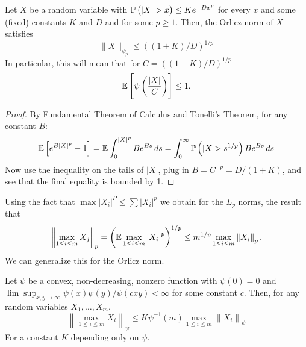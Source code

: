 \begin{lemma}
	\label{lemma:vdv2.2.1}
	Let \(X\) be a random variable  with  \(\P\left(|X|>x\right)\leq Ke^{-Dx^p}\) for every \(x\) and some (fixed) constants  \(K\) and  \(D\) and for some  \(p \geq 1\). Then, the Orlicz norm of \(X\) satisfies  \[\|X\|_{\psi_p}\leq \left((1+K)/D\right)^{1/p}\]
	In particular, this will mean that for \(C = \left((1+K)/D\right)^{1/p}\)
	\[
	    \mathbb{E}\left[\psi\left(\frac{|X|}{C}\right)\right]\leq 1
	.\] 
\end{lemma}
\begin{proof}
	By Fundamental Theorem of Calculus and Tonelli's Theorem, for any constant \(B\):
	\begin{align*}
		\mathbb{E}\left[e^{B|X|^p}-1\right]= \mathbb{E}\int_0^{|X|^p}Be^{Bs}\,ds = \int_0^\infty \mathbb{P}\left(|X> s^{1/p}\right)Be^{Bs}\,ds
	\end{align*}
	Now use the inequality on the tails of \(|X|\), plug in \(B = C^{-p}= D/(1+K)\), and see that the final equality is bounded by 1.
\end{proof}

Using the fact that \(\max|X_i|^P \leq \sum |X_i|^p\) we obtain for the \(L_p\) norms, the result that 
\[
	\left\|\max_{1\leq i\leq m}X_j\right\|_p = \left(\mathbb{E}\max_{1\leq i\leq m}\left|X_i\right|^p\right)^{1/p} \leq m^{1/p}\max_{1\leq i\leq m}\left\|X_i\right\|_p
.\]
We can generalize this for the Orlicz norm.
\begin{lemma}
	\label{lemma:vdv2.2.2}
	Let \(\psi\) be a convex, non-decreasing, nonzero function with  \(\psi(0)=0\) and  \(\lim\sup_{x,y\to\infty}\psi(x)\psi(y)/\psi(cxy)<\infty\) for some constant \(c\). Then, for any random variables  \(X_1,\dots,X_m\),
	\begin{equation}
		\label{eq:vdv2.2.2}
		\left\|\max_{1\leq i\leq m}X_i\right\|_\psi \leq K\psi^{-1}(m)\max_{1\leq i\leq m}\left\|X_i\right\|_\psi
	\end{equation}
	For a constant \(K\) depending only on  \(\psi\).
\end{lemma}

